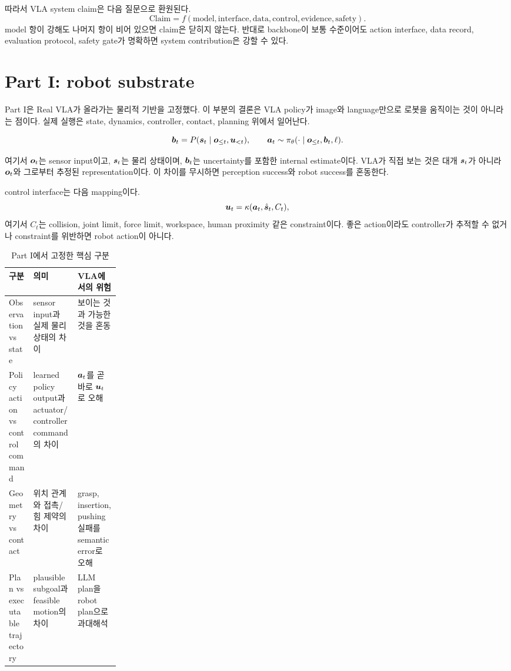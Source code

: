 따라서 VLA system claim은 다음 질문으로 환원된다.
\begin{equation}
  \mathrm{Claim}
  =
  f(
  \mathrm{model},
  \mathrm{interface},
  \mathrm{data},
  \mathrm{control},
  \mathrm{evidence},
  \mathrm{safety}
  ).
  \label{eq:ch21-system-claim}
\end{equation}
model 항이 강해도 나머지 항이 비어 있으면 claim은 닫히지 않는다. 반대로 backbone이 보통 수준이어도 action interface, data record, evaluation protocol, safety gate가 명확하면 system contribution은 강할 수 있다.

\section{Part I: robot substrate}

Part I은 Real VLA가 올라가는 물리적 기반을 고정했다. 이 부분의 결론은 VLA policy가 image와 language만으로 로봇을 움직이는 것이 아니라는 점이다. 실제 실행은 state, dynamics, controller, contact, planning 위에서 일어난다.

\begin{equation}
  \bm{b}_t
  =
  P(\bm{s}_t \mid \bm{o}_{\leq t},\bm{u}_{<t}),
  \qquad
  \bm{a}_t
  \sim
  \pi_{\theta}(\cdot \mid \bm{o}_{\leq t},\bm{b}_t,\ell).
  \label{eq:ch21-belief-policy}
\end{equation}

여기서 $\bm{o}_t$는 sensor input이고, $\bm{s}_t$는 물리 상태이며, $\bm{b}_t$는 uncertainty를 포함한 internal estimate이다. VLA가 직접 보는 것은 대개 $\bm{s}_t$가 아니라 $\bm{o}_t$와 그로부터 추정된 representation이다. 이 차이를 무시하면 perception success와 robot success를 혼동한다.

control interface는 다음 mapping이다.
\begin{equation}
  \bm{u}_t
  =
  \kappa(\bm{a}_t,\hat{\bm{s}}_t,C_t),
  \label{eq:ch21-action-control}
\end{equation}
여기서 $C_t$는 collision, joint limit, force limit, workspace, human proximity 같은 constraint이다. 좋은 action이라도 controller가 추적할 수 없거나 constraint를 위반하면 robot action이 아니다.

\begin{table}[h]
  \centering
  \caption{Part I에서 고정한 핵심 구분}
  \begin{tabularx}{\linewidth}{p{0.22\linewidth}X X}
    \toprule
    구분 & 의미 & VLA에서의 위험 \\
    \midrule
    Observation vs state & sensor input과 실제 물리 상태의 차이 & 보이는 것과 가능한 것을 혼동 \\
    Policy action vs control command & learned policy output과 actuator/controller command의 차이 & $\bm{a}_t$를 곧바로 $\bm{u}_t$로 오해 \\
    Geometry vs contact & 위치 관계와 접촉/힘 제약의 차이 & grasp, insertion, pushing 실패를 semantic error로 오해 \\
    Plan vs executable trajectory & plausible subgoal과 feasible motion의 차이 & LLM plan을 robot plan으로 과대해석 \\
    \bottomrule
  \end{tabularx}
  \label{tab:ch21-part1-summary}
\end{table}

